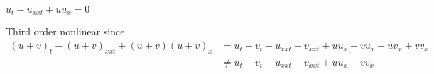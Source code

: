 $u_t - u_{xxt} + uu_x = 0$

\soln* Third order nonlinear since
\begin{align*}
    (u+v)_t - (u+v)_{xxt} + (u+v)(u+v)_x &= u_t + v_t - u_{xxt} - v_{xxt} + uu_x + vu_x + uv_x + vv_x\\ &\neq  u_t + v_t - u_{xxt} - v_{xxt} + uu_x + vv_x
\end{align*}